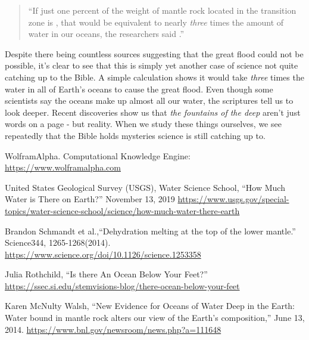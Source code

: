 \documentclass[10pt]{article}
\begin{document}
\begin{multicols}{2}
\begin{quotation}
\noindent``If just one percent of the weight of mantle rock located in the transition zone is , that would be equivalent to nearly \textit{three} times the amount of water in our oceans, the researchers said \cite{deep earth water}.''
\end{quotation}

Despite there being countless sources suggesting that the great flood could not be possible, it's clear to see that this is simply yet another case of science not quite catching up to the Bible. A simple calculation shows it would take \textit{three} times the water in all of Earth's oceans to cause the great flood. Even though some scientists say the oceans make up almost all our water, the scriptures tell us to look deeper. Recent discoveries show us that \textit{the fountains of the deep} aren't just words on a page - but reality. When we study these things ourselves, we see repeatedly that the Bible holds mysteries science is still catching up to.




\begin{thebibliography}{9}
	{\footnotesize
		
	 WolframAlpha. Computational Knowledge Engine: \url{https://www.wolframalpha.com}
	
	 United States Geological Survey (USGS), Water Science School, ``How Much Water is There on Earth?'' November 13, 2019  \url{https://www.usgs.gov/special-topics/water-science-school/science/how-much-water-there-earth}
		
	 Brandon Schmandt et al.,``Dehydration melting at the top of the lower mantle.'' Science344, 1265-1268(2014). \url{https://www.science.org/doi/10.1126/science.1253358}
		
	 Julia Rothchild, ``Is there An Ocean Below Your Feet?'' \url{https://ssec.si.edu/stemvisions-blog/there-ocean-below-your-feet}
		
	 Karen McNulty Walsh, ``New Evidence for Oceans of Water Deep in the Earth: Water bound in mantle rock alters our view of the Earth's composition,'' June 13, 2014. \url{https://www.bnl.gov/newsroom/news.php?a=111648}
	
	}
\end{thebibliography}

\end{multicols}


\end{document}
